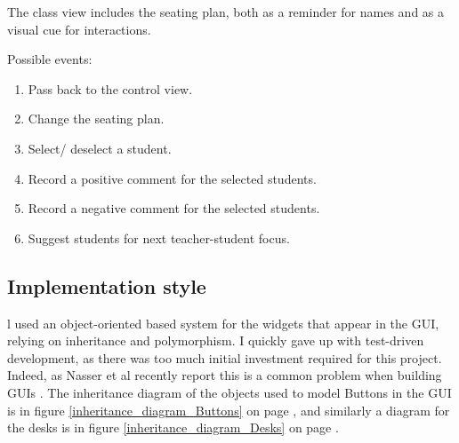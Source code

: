 \documentclass[10pt]{article}
\begin{document}
The class view includes the seating plan, both as a reminder for names and as a visual cue for interactions.

\begin{center}
\end{center}

Possible events: 
\begin{enumerate}
\item Pass back to the control view.
\item Change the seating plan.
\item Select/ deselect a student.
\item Record a positive comment for the selected students.
\item Record a negative comment  for the selected students.
\item Suggest students for next teacher-student focus.
\end{enumerate}

\subsection{Implementation style}
l used an object-oriented based system for the widgets that appear in the GUI, relying on inheritance and polymorphism. I quickly gave up with test-driven development, as there was too much initial investment required for this project. Indeed, as Nasser et al recently report this is a common problem when building GUIs \cite{Nass21}. The inheritance diagram of the objects used to model Buttons in the GUI is in figure \ref{inheritance_diagram_Buttons} on page \pageref{inheritance_diagram_Buttons}, and similarly a diagram for the desks is in figure \ref{inheritance_diagram_Desks} on page \pageref{inheritance_diagram_Desks}.
\end{document}
